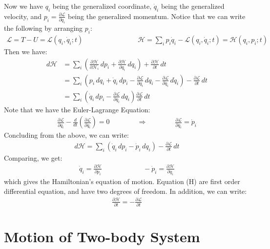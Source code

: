 \documentclass[11pt,oneside]{book}
\theoremstyle{break}
\theoremstyle{break}
\begin{document}
Now we have $q_i$ being the generalized coordinate, $\dot{q}_i$ being the generalized velocity, and $p_i = \frac{\partial \mathcal{L}}{\partial \dot{q}_i}$ being the generalized momentum. Notice that we can write the following by arranging $p_i$:
\begin{align*}
\mathcal{L} = T- U = \mathcal{L}(q_i, \dot{q}_i;t) \qquad\qquad\qquad\qquad \mathcal{H} = \sum_i p_i \dot{q}_i -  \mathcal{L}(q_i, \dot{q}_i;t) = \mathcal{H}(q_i,p_i;t)
\end{align*}
Then we have:
\begin{align*}
d\mathcal{H} &= \sum_i \left( \frac{\partial \mathcal{H}}{\partial \mathcal{H}_i}\,dp_i + \frac{\partial \mathcal{H}}{\partial q_i}\, dq_i\right) + \frac{\partial \mathcal{H}}{\partial t}\, dt \\
&= \sum_i \left( p_i \,d\dot{q}_i + \dot{q}_i \, dp_i - \frac{\partial \mathcal{L}}{\partial q_i}\, dq_i - \frac{\partial \mathcal{L}}{\partial \dot{q}_i}\, d\dot{q}_i \right) - \frac{\partial \mathcal{L}}{\partial t}\, dt\\
&= \sum_i \left( \dot{q}_i\, dp_i - \frac{\partial \mathcal{L}}{\partial q_i}\, dq_i \right) \frac{\partial \mathcal{L}}{\partial t}\,dt
\end{align*}
Note that we have the Euler-Lagrange Equation:
\begin{align*}
\frac{\partial \mathcal{L}}{\partial q_i} - \frac{d}{dt}\left( \frac{\partial \mathcal{L}}{\partial \dot{q}_i} \right)= 0 \qquad\qquad\Rightarrow\qquad \qquad \frac{\partial \mathcal{L}}{\partial q_i} = \dot{p}_i
\end{align*}
Concluding from the above, we can write:
\begin{align*}
d\mathcal{H} = \sum_i \left( \dot{q}_i \, dp_i - \dot{p}_i\, dq_i\right) - \frac{\partial \mathcal{L}}{\partial t}\, dt
\end{align*}
Comparing, we get:
\begin{align*}
\dot{q}_i = \frac{\partial \mathcal{H}}{\partial p_i} \qquad\qquad\qquad -\dot{p}_i = \frac{\partial \mathcal{H}}{\partial q_i} \tag{H}
\end{align*}
which gives the Hamiltonian's equation of motion. Equation (H) are first order differential equation, and have two degrees of freedom. In addition, we can write:
\begin{align*}
\frac{\partial \mathcal{H}}{\partial t} = -\frac{\partial \mathcal{L}}{\partial t}
\end{align*}

\chapter{Motion of Two-body System}
\end{document}
